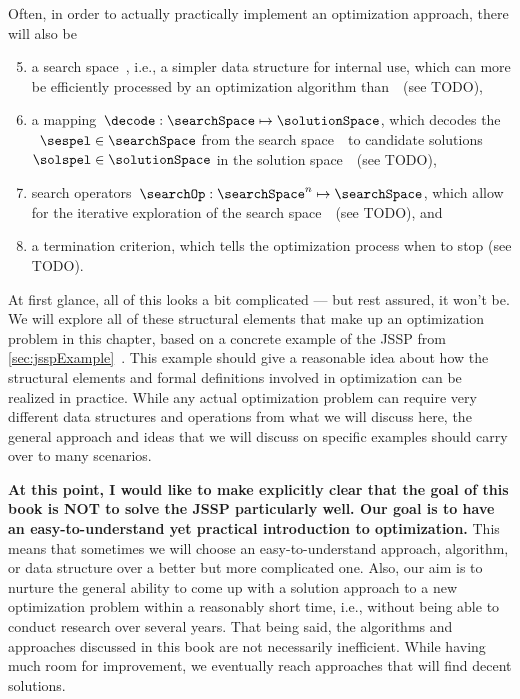 Often, in order to actually practically implement an optimization approach, there will also be%
%
\begin{enumerate}%
\setcounter{enumi}{4}%
%
\item a search space~\searchSpace, i.e., a simpler data structure for internal use, which can more be efficiently processed by an optimization algorithm than~\solutionSpace\ (see TODO),%
%
\item a mapping~$\decode:\searchSpace\mapsto\solutionSpace$, which decodes the ~$\sespel\in\searchSpace$ from the search space~\searchSpace\ to candidate solutions~$\solspel\in\solutionSpace$ in the solution space~\solutionSpace\ (see TODO),%
%
\item search operators~$\searchOp:\searchSpace^n\mapsto\searchSpace$, which allow for the iterative exploration of the search space~\searchSpace\ (see TODO), and%
%
\item a termination criterion, which tells the optimization process when to stop (see TODO).%
%
\end{enumerate}%
%
At first glance, all of this looks a bit complicated --- but rest assured, it won't be.
We will explore all of these structural elements that make up an optimization problem in this chapter, based on a concrete example of the \acrfull{JSSP} from \autoref{sec:jsspExample}~\cite{GLLRK1979OAAIDSASAS,LLRKS1993SASAAC,L1982RRITTOMS,T1993BFBSP,BDP1996TJSSPCANST}.
This example should give a reasonable idea about how the structural elements and formal definitions involved in optimization can be realized in practice.
While any actual optimization problem can require very different data structures and operations from what we will discuss here, the general approach and ideas that we will discuss on specific examples should carry over to many scenarios.

\textbf{At this point, I would like to make explicitly clear that the goal of this book is NOT to solve the \gls{JSSP} particularly well. Our goal is to have an easy-to-understand yet practical introduction to optimization.}
This means that sometimes we will choose an easy-to-understand approach, algorithm, or data structure over a better but more complicated one.
Also, our aim is to nurture the general ability to come up with a solution approach to a new optimization problem within a reasonably short time, i.e., without being able to conduct research over several years.
That being said, the algorithms and approaches discussed in this book are not necessarily inefficient.
While having much room for improvement, we eventually reach approaches that will find decent solutions.%
\endhsection%
%
